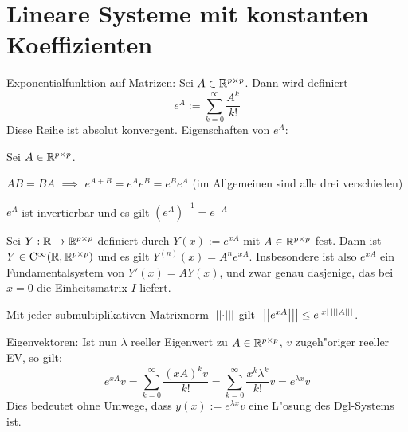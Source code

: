 \section{Lineare Systeme mit konstanten Koeffizienten}
\label{sec:linear-const-system}
 Exponentialfunktion auf Matrizen:{
  Sei $A\in\mathbb R^{p\times p}$. Dann wird definiert
  \[e^A:=\sum_{k=0}^\infty \frac{A^k}{k!}
    \]
  Diese Reihe ist absolut konvergent.
  }
\remark Eigenschaften von $e^A$:{
  Sei $A\in\mathbb R^{p\times p}$.
  \begin{stmts}
    \item $AB=BA$ $\implies$ $e^{A+B}=e^Ae^B=e^Be^A$ (im Allgemeinen sind
      alle drei verschieden)
    \item $e^A$ ist invertierbar und es gilt $(e^A)^{-1}=e^{-A}$
    \item Sei $Y:\mathbb R\to\mathbb R^{p\times p}$ definiert durch $Y(x):=e^{xA}$ mit
      $A\in\mathbb R^{p\times p}$ fest.  Dann ist 
      $Y\in{\rm C}^\infty(\mathbb R,\mathbb R^{p\times p})$ und es gilt
      $Y^{(n)}(x)=A^ne^{xA}$. Insbesondere ist also $e^{xA}$ ein 
      Fundamentalsystem von $Y'(x)=AY(x)$, und zwar genau dasjenige,
      das bei $x=0$ die Einheitsmatrix $I$ liefert.
    \item Mit jeder submultiplikativen Matrixnorm ${\left|\left|\left|\cdot\right|\right|\right|}$ gilt
      ${\left|\left|\left|e^{xA}\right|\right|\right|}\leq e^{|x|\,{\left|\left|\left|A\right|\right|\right|}}$.
    \end{stmts}
  }
\remark Eigenvektoren:{
  Ist nun $\lambda$ reeller Eigenwert zu $A\in\mathbb R^{p\times p}$, 
  $v$ zugeh"origer reeller EV, so gilt:
  \[e^{xA}v=\sum_{k=0}^\infty \frac {(xA)^kv}{k!}
    =\sum_{k=0}^\infty \frac {x^k\lambda^k}{k!} v
    =e^{\lambda x}v
    \]
  Dies bedeutet ohne Umwege, dass $y(x):=e^{\lambda x}v$ eine L"osung
  des Dgl-Systems ist.
  }

